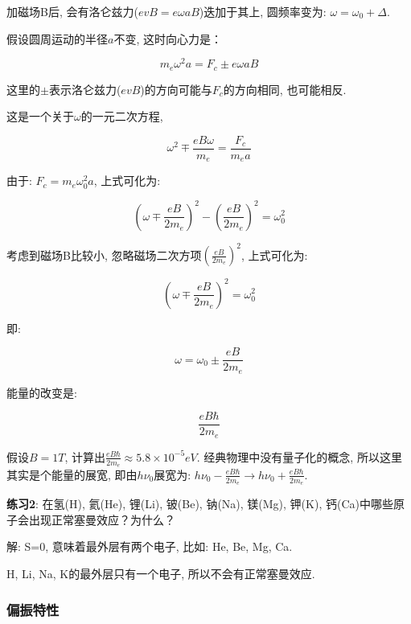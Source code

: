 加磁场B后, 会有洛仑兹力($evB = e \omega a B $)迭加于其上,
圆频率变为: $\omega = \omega_0 + \Delta$.

假设圆周运动的半径$a$不变, 这时向心力是：

\begin{equation*}
m_e \omega^2 a = F_c \pm e \omega a B
\end{equation*}

这里的$\pm$表示洛仑兹力($e v B$)的方向可能与$F_c$的方向相同,
也可能相反.

这是一个关于$\omega$的一元二次方程,

\begin{equation*}
\omega^2 \mp \frac{eB\omega}{m_e} = \frac{F_c}{m_e a}
\end{equation*}

由于: $F_c = m_e \omega_0^2 a$, 上式可化为:

\begin{equation*}
\left( \omega \mp \frac{eB}{2m_e} \right)^2 - \left(
\frac{eB}{2m_e}\right)^2 = \omega_0^2
\end{equation*}

考虑到磁场B比较小, 忽略磁场二次方项$\left(
\frac{eB}{2m_e}\right)^2$, 上式可化为:

\begin{equation*}
\left( \omega \mp \frac{eB}{2m_e} \right)^2 = \omega_0^2
\end{equation*}

即:

\begin{equation*}
\omega = \omega_0 \pm \frac{eB}{2m_e}
\end{equation*}

能量的改变是:

\begin{equation*}
 \frac{eB\hbar}{2m_e}
\end{equation*}

假设$B=1T$, 计算出$\frac{eB\hbar}{2m_e} \approx 5.8 \times 10^{-5}
eV$. 经典物理中没有量子化的概念, 所以这里其实是个能量的展宽,
即由$h\nu_0$展宽为: $h\nu_0 - \frac{eB\hbar}{2m_e} \to h\nu_0 +
\frac{eB\hbar}{2m_e}$.


\textbf{练习2}: 在氢(H), 氦(He), 锂(Li), 铍(Be), 钠(Na), 镁(Mg),
钾(K), 钙(Ca)中哪些原子会出现正常塞曼效应？为什么？

解: S=0, 意味着最外层有两个电子, 比如: He, Be, Mg, Ca.

H, Li, Na, K的最外层只有一个电子, 所以不会有正常塞曼效应.

\subsubsection{偏振特性}


